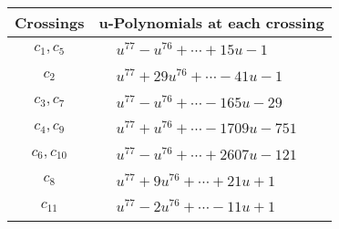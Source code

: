 \documentclass[1p]{elsarticle_modified}
\theoremstyle{definition}
\begin{document}
\begin{tabular}{m{50pt}|m{274pt}}
Crossings & \hspace{64pt}u-Polynomials at each crossing \\
\hline $$\begin{aligned}c_{1},c_{5}\end{aligned}$$&$\begin{aligned}
&u^{77}- u^{76}+\cdots+15 u-1
\end{aligned}$\\
\hline $$\begin{aligned}c_{2}\end{aligned}$$&$\begin{aligned}
&u^{77}+29 u^{76}+\cdots-41 u-1
\end{aligned}$\\
\hline $$\begin{aligned}c_{3},c_{7}\end{aligned}$$&$\begin{aligned}
&u^{77}- u^{76}+\cdots-165 u-29
\end{aligned}$\\
\hline $$\begin{aligned}c_{4},c_{9}\end{aligned}$$&$\begin{aligned}
&u^{77}+u^{76}+\cdots-1709 u-751
\end{aligned}$\\
\hline $$\begin{aligned}c_{6},c_{10}\end{aligned}$$&$\begin{aligned}
&u^{77}- u^{76}+\cdots+2607 u-121
\end{aligned}$\\
\hline $$\begin{aligned}c_{8}\end{aligned}$$&$\begin{aligned}
&u^{77}+9 u^{76}+\cdots+21 u+1
\end{aligned}$\\
\hline $$\begin{aligned}c_{11}\end{aligned}$$&$\begin{aligned}
&u^{77}-2 u^{76}+\cdots-11 u+1
\end{aligned}$\\
\hline
\end{tabular}\\~\\
\newpage\renewcommand{\arraystretch}{1}
\end{document}
